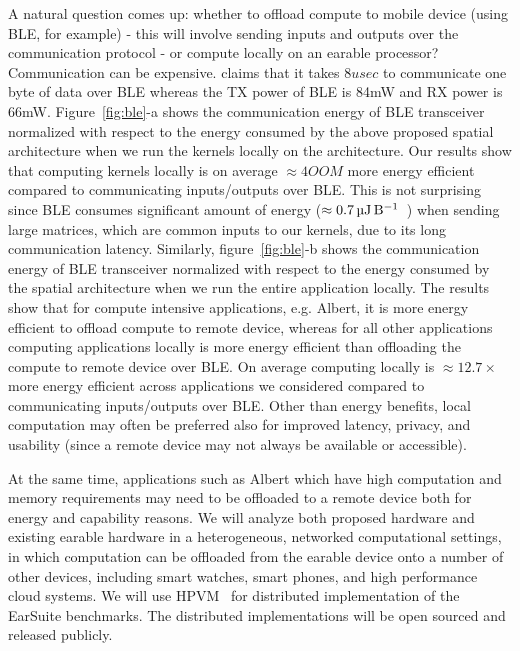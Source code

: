 A natural question comes up: whether to offload compute to 
mobile device (using BLE, for example) - this will involve sending inputs and outputs over the communication protocol - or compute locally on an earable processor? 
 Communication can be expensive. \cite{ble} claims that it takes $8usec$ to communicate one byte of data over BLE whereas the TX power of BLE is 84mW and RX power is 66mW. 
Figure~\ref{fig:ble}-a shows the 
communication energy of BLE transceiver normalized with respect to the energy consumed by the above proposed spatial architecture when we run the kernels locally on the architecture. Our results show that 
computing kernels locally is on average $\approx4OOM$ more energy efficient compared to communicating inputs/outputs over BLE. This is not surprising since BLE
consumes significant amount of energy ($\approx\SI{0.7}{\micro\joule\per\byte}$~\cite{ble}) when sending large matrices, which are common inputs to our kernels, due to its long communication latency.
Similarly, figure~\ref{fig:ble}-b shows the 
communication energy of BLE transceiver normalized with respect to the energy consumed by the spatial architecture when we run the entire application locally. The results show that 
for compute intensive applications, e.g. Albert, it is more energy efficient to offload compute to remote device,
whereas for all other applications 
computing applications locally is more energy efficient than offloading the compute to remote device over BLE.
On average computing locally  is $\approx12.7\times$ more energy efficient across applications we considered compared to communicating inputs/outputs over BLE. 
Other than energy benefits, local computation may often be preferred also for improved 
latency, privacy, and usability (since a remote device may not always be available or accessible).

At the same time, applications such as Albert which have high computation and
memory requirements may need to be offloaded to a remote device both for energy
and capability reasons. We will analyze both proposed hardware and existing
earable hardware in a heterogeneous, networked computational settings, in which
computation can be offloaded from the earable device onto a number of other
devices, including smart watches,  smart phones, and high performance cloud
systems. We will use HPVM~\cite{ejjeh2022hpvm} for distributed implementation
of the EarSuite benchmarks. The distributed implementations will be open
sourced and released publicly.
